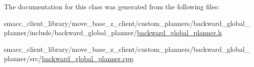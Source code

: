The documentation for this class was generated from the following files\+:\begin{DoxyCompactItemize}
\item 
smacc\+\_\+client\+\_\+library/move\+\_\+base\+\_\+z\+\_\+client/custom\+\_\+planners/backward\+\_\+global\+\_\+planner/include/backward\+\_\+global\+\_\+planner/\hyperlink{backward__global__planner_8h}{backward\+\_\+global\+\_\+planner.\+h}\item 
smacc\+\_\+client\+\_\+library/move\+\_\+base\+\_\+z\+\_\+client/custom\+\_\+planners/backward\+\_\+global\+\_\+planner/src/\hyperlink{backward__global__planner_8cpp}{backward\+\_\+global\+\_\+planner.\+cpp}\end{DoxyCompactItemize}
